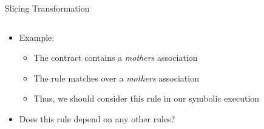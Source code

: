 \documentclass[12pt, handout]{beamer}
\begin{document}
\begin{frame}{Slicing Transformation}
\begin{columns}[T]
\begin{column}[T]{0.55\textwidth}
\begin{itemize}[<+->]
\begin{itemize}[<+->]
\end{itemize}
\item Example:
\begin{itemize}
\item The contract contains a \textit{mothers} association
\item The rule matches over a \textit{mothers} association
\item Thus, we should consider this rule in our symbolic execution
\end{itemize}
\item Does this rule depend on any other rules?
\end{itemize}
 \end{column}
 \end{columns}
\end{frame}
\end{document}
